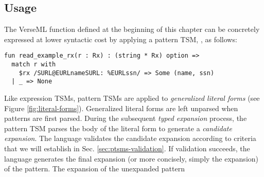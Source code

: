 \subsection{Usage}\label{sec:ptsms-usage}
The VerseML function  defined at the beginning of this chapter can be concretely expressed at lower syntactic cost by applying a pattern TSM, , as follows:
\begin{lstlisting}
fun read_example_rx(r : Rx) : (string * Rx) option => 
  match r with 
    $rx /SURL@EURLnameSURL: %EURLssn/ => Some (name, ssn)
  | _ => None
\end{lstlisting}
Like expression TSMs, pattern TSMs are applied to \emph{generalized literal forms} (see Figure \ref{fig:literal-forms}). Generalized literal forms are left unparsed when patterns are first parsed. During the subsequent \emph{typed expansion} process, the pattern TSM parses the body of the literal form to generate a \emph{candidate expansion}. The language validates the candidate expansion according to criteria that we will establish in Sec. \ref{sec:ptsms-validation}. If validation succeeds, the language generates the final expansion (or more concisely, simply the expansion) of the pattern. The expansion of the unexpanded pattern \li{#\dolla#rx /SURL@EURLnameSURL: %
\begin{lstlisting}[numbers=none]
Seq(Str(name), Seq(Str "SSTR: ESTR", ssn))
\end{lstlisting}

The checks for exhaustiveness and redundancy can be performed post-expansion in the usual way, so we do not need to consider them further here. 
}
